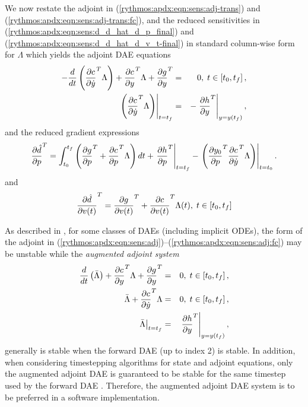 \documentclass[pdf,ps2pdf,11pt]{SANDreport}
\begin{document}
We now restate the adjoint in (\ref{rythmos:apdx:eqn:sens:adj-trans}) and
(\ref{rythmos:apdx:eqn:sens:adj-trans:fc}), and the reduced sensitivities in
(\ref{rythmos:apdx:eqn:sens:d_d_hat_d_p_final}) and
(\ref{rythmos:apdx:eqn:sens:d_d_hat_d_v_t-final}) in standard column-wise form
for $\Lambda$ which yields the adjoint DAE equations
%
\begin{eqnarray}
- \frac{d}{dt}\left( \displaystyle{\frac{\partial c}{\partial \dot{y}}}^T \Lambda \right)
+  \displaystyle{\frac{\partial c}{\partial y}}^T \Lambda + \displaystyle{\frac{\partial g}{\partial y}}^T
& = & 0, \; t \in \left[ t_0, t_f \right],
\label{rythmos:apdx:eqn:sens:adj} \\
\left.\left( \displaystyle{\frac{\partial c}{\partial \dot{y}}}^T \Lambda \right)\right|_{t=t_f}
& = & - \left. \displaystyle{\frac{\partial h}{\partial y}}^T \right|_{y=y(t_f)},
\label{rythmos:apdx:eqn:sens:adj:fc}
\end{eqnarray}
%
and the reduced gradient expressions
%
\begin{equation}
\displaystyle{\frac{\partial \hat{d}}{\partial p}}^T =
\int_{t_0}^{t_f} \left(
    \displaystyle{\frac{\partial g}{\partial p}}^T
    + \displaystyle{\frac{\partial c}{\partial p}}^T \Lambda
  \right) dt
  + \left. \displaystyle{\frac{\partial h}{\partial p}}^T \right|_{t=t_f}
  - \left. \left( \displaystyle{\frac{\partial y_0}{\partial p}}^T \displaystyle{\frac{\partial c}{\partial \dot{y}}}^T \Lambda \right) \right|_{t=t_0}.
\label{rythmos:apdx:eqn:sens:d_d_hat_d_p_final-2}
\end{equation}
%
and
%
\begin{equation}
\displaystyle{\frac{\partial \hat{d}}{\partial v(t)}}^T =  \displaystyle{\frac{\partial g}{\partial v(t)}}^T + \displaystyle{\frac{\partial c}{\partial v(t)}}^T \Lambda(t), \; t\in[t_0,t_f]
\label{rythmos:apdx:eqn:sens:d_d_hat_d_v_t-final-2}
\end{equation}
%

As described in {}\cite{adjoint-sens-2003}, for some classes of DAEs
(including implicit ODEs), the form of the adjoint in
(\ref{rythmos:apdx:eqn:sens:adj})--(\ref{rythmos:apdx:eqn:sens:adj:fc}) may be
unstable while the {}\textit{augmented adjoint system}
%
\begin{eqnarray}
\frac{d}{dt}\left( \bar{\Lambda} \right)
+  \displaystyle{\frac{\partial c}{\partial y}}^T \Lambda + \displaystyle{\frac{\partial g}{\partial y}}^T
& = & 0, \; t \in \left[ t_0, t_f \right],
\label{rythmos:apdx:eqn:sens:aug-adj-de} \\
\bar{\Lambda} + \displaystyle{\frac{\partial c}{\partial \dot{y}}}^T \Lambda
& = & 0, \; t \in \left[ t_0, t_f \right],
\label{rythmos:apdx:eqn:sens:aug-adj-ae} \\
\left. \bar{\Lambda} \right|_{t=t_f}
& = & \left. \displaystyle{\frac{\partial h}{\partial y}}^T \right|_{y=y(t_f)},
\label{rythmos:apdx:eqn:sens:aug-adj:fc}
\end{eqnarray}
%
generally is stable when the forward DAE (up to index 2) is stable.  In
addition, when considering timestepping algorithms for state and adjoint
equations, only the augmented adjoint DAE is guaranteed to be stable for the
same timestep used by the forward DAE {}\cite{adjoint-sens-2003}.  Therefore,
the augmented adjoint DAE system is to be preferred in a software
implementation.
\end{document}
